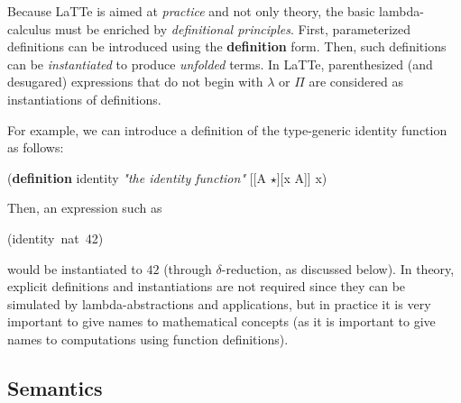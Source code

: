 \documentclass{styles/sig-alternate-05-2015}
\newcommand{\typeterm}{\star}
\newcommand{\kw}[1]{\textbf{#1}}
\newcommand{\cmt}[1]{\textit{#1}}
\newcommand{\code}[1]{\begin{sffamily}{\small #1}\end{sffamily}}
\begin{document}
 Because LaTTe is aimed at \emph{practice} and not only theory, the basic lambda-calculus must be enriched by \emph{definitional principles}.
 First, parameterized definitions can be introduced using the \kw{definition} form. Then, such definitions can be \emph{instantiated} to produce \emph{unfolded} terms.
 In LaTTe, parenthesized (and desugared) expressions that do not begin with $\lambda$ or $\Pi$ are considered as instantiations of definitions.

 For example, we can introduce a definition of the type-generic identity function as follows:

 \begin{program}
 (\kw{definition} identity
   \cmt{"the identity function"}
   [[A $\typeterm$][x A]]
   x)
 \end{program}

 Then, an expression such as \code{(identity~nat~42)} would be instantiated to $42$ (through $\delta$-reduction, as discussed below).
 In theory, explicit definitions and instantiations are not required since they can be simulated by lambda-abstractions and applications,
 but in practice it is very important to give names to mathematical concepts (as it is important to give names to computations using
  function definitions).

\subsection{Semantics}
\end{document}
